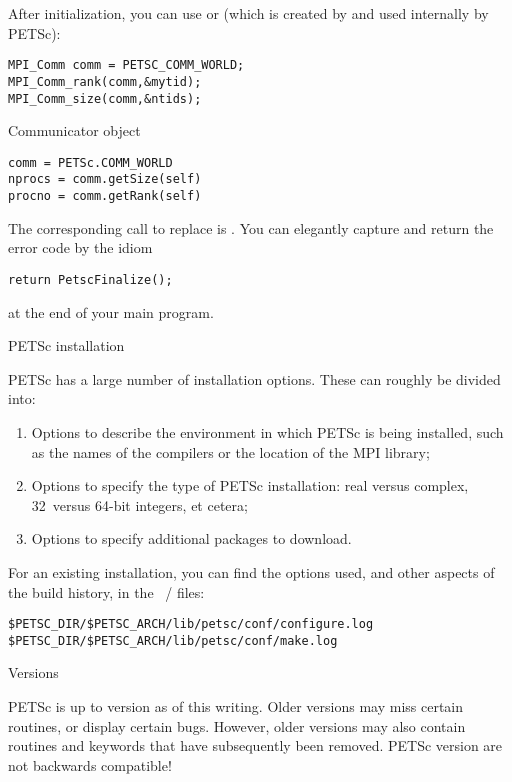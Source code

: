 After initialization, you can use  or
(which is created by  and used internally by PETSc):

\begin{lstlisting}
MPI_Comm comm = PETSC_COMM_WORLD;
MPI_Comm_rank(comm,&mytid);
MPI_Comm_size(comm,&ntids);
\end{lstlisting}

\begin{pythonnote}{Communicator object}
\begin{verbatim}
comm = PETSc.COMM_WORLD
nprocs = comm.getSize(self) 
procno = comm.getRank(self)
\end{verbatim}
\end{pythonnote}

The corresponding call to replace  is
.
You can elegantly capture and return the error code by the idiom
\begin{lstlisting}
return PetscFinalize();
\end{lstlisting}
at the end of your main program.

 {PETSc installation}
\label{sec:petsc-install}

PETSc has a large number of installation options. These can roughly be
divided into:
\begin{enumerate}
\item Options to describe the environment in which PETSc is being
  installed, such as the names of the compilers or the location of the
  MPI library;
\item Options to specify the type of PETSc installation: real versus
  complex, 32~versus 64-bit integers, et cetera;
\item Options to specify additional packages to download.
\end{enumerate}

For an existing installation, you can find the options used,
and other aspects of the build history,
in the ~/ 
files:
\begin{verbatim}
$PETSC_DIR/$PETSC_ARCH/lib/petsc/conf/configure.log
$PETSC_DIR/$PETSC_ARCH/lib/petsc/conf/make.log
\end{verbatim}

 {Versions}

PETSc is up to version  as of this writing.
Older versions may miss certain routines, or display certain bugs.
However, older versions may also contain routines and keywords
that have subsequently been removed. PETSc version are not
backwards compatible!

